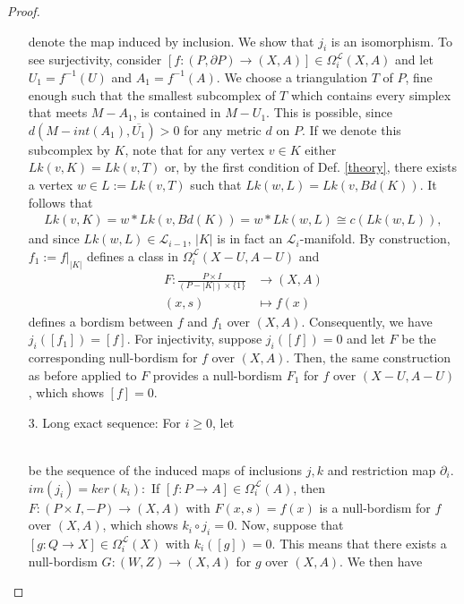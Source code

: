 \documentclass{scrreprt}
\begin{document}
\begin{proof}
\begin{itemize}
\begin{equation*}
\end{equation*}
denote the map induced by inclusion. We show that $j_i$ is an isomorphism. To see surjectivity, consider $[f: (P, \partial P) \to (X,A)] \in \Omega_i^{\mathcal{L}}(X,A)$ and let $U_1 = f^{-1}(U)$ and $A_1= f^{-1}(A)$. We choose a triangulation $T$ of $P$, fine enough such that the smallest subcomplex of $T$ which contains every simplex that meets $M-A_1$, is contained in $M-U_1$. This is possible, since $d(M-int(A_1), \overline{U_1})>0$ for any metric $d$ on $P$. If we denote this subcomplex by $K$, note that for any vertex $v \in K$ either $Lk(v,K)=Lk(v,T)$ or, by the first condition of Def. \ref{theory}, there exists a vertex $w \in L:= Lk(v,T)$ such that $Lk(w,L)=Lk(v,Bd(K))$. It follows that
\begin{align*}
Lk(v,K) = w * Lk(v,Bd(K)) = w * Lk(w,L) \cong c(Lk(w,L)),
\end{align*}
and since $Lk(w,L) \in \mathcal{L}_{i-1}$, $|K|$ is in fact an $\mathcal{L}_i$-manifold. By construction, \\ $f_1:=f|_{|K|}$ defines a class in $\Omega_i^{\mathcal{L}}(X-U,A-U)$ and 
\begin{align*}
F: \frac{P \times I}{ (P-|K|) \times \{ 1 \} } &\to (X,A) \\
(x,s) &\mapsto f(x)
\end{align*}
defines a bordism between $f$ and $f_1$ over $(X,A)$. Consequently, we have \\ $j_i ([f_1]) = [f]$. For injectivity, suppose $j_i([f])=0$ and let $F$ be the corresponding null-bordism for $f$ over $(X,A)$. Then, the same construction as before applied to $F$ provides a null-bordism $F_1$ for $f$ over $(X-U,A-U)$, which shows $[f]=0$.
\item[3.] Long exact sequence: For $i \geq 0$, let \\
\\
be the sequence of the induced maps of inclusions $j,k$ and restriction map $\partial_i$. \\
{$im(j_i) = ker(k_i):$} If $[f:P \to A] \in \Omega_i^{\mathcal{L}}(A)$, then $F: (P \times I, -P) \to (X,A)$ with $F(x,s)=f(x)$ is a null-bordism for $f$ over $(X,A)$, which shows $k_i \circ j_i = 0$. Now, suppose that $[g: Q \to X] \in \Omega_i^{\mathcal{L}}(X)$ with $k_i([g])=0$. This means that there exists a null-bordism $G: (W,Z) \to (X,A)$ for $g$ over $(X,A)$. We then have 

\end{itemize}
\end{proof}
\end{document}
